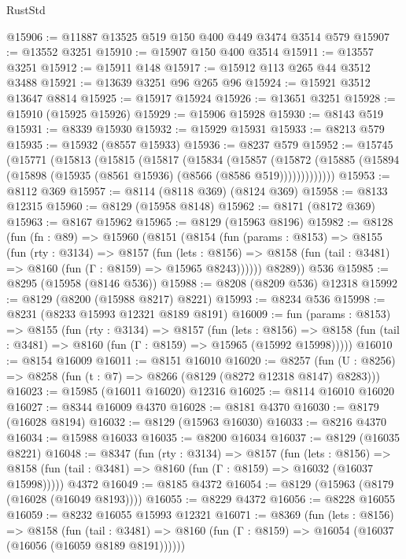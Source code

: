 \begin{lexlean}{RustStd}
\begin{coremodule}
@15906 := @11887 @13525 @519 @150 @400 @449 @3474 @3514 @579
@15907 := @13552 @3251
@15910 := @15907 @150 @400 @3514
@15911 := @13557 @3251
@15912 := @15911 @148
@15917 := @15912 @113 @265 @44 @3512 @3488
@15921 := @13639 @3251 @96 @265 @96
@15924 := @15921 @3512 @13647 @8814
@15925 := @15917 @15924
@15926 := @13651 @3251
@15928 := @15910 (@15925 @15926)
@15929 := @15906 @15928
@15930 := @8143 @519
@15931 := @8339 @15930
@15932 := @15929 @15931
@15933 := @8213 @579
@15935 := @15932 (@8557 @15933)
@15936 := @8237 @579
@15952 := @15745
    (@15771
      (@15813
        (@15815
          (@15817
            (@15834
              (@15857
                (@15872
                  (@15885 (@15894 (@15898 (@15935 (@8561 @15936) (@8566 (@8586 @519)))))))))))))
@15953 := @8112 @369
@15957 := @8114 (@8118 @369) (@8124 @369)
@15958 := @8133 @12315
@15960 := @8129 (@15958 @8148)
@15962 := @8171 (@8172 @369)
@15963 := @8167 @15962
@15965 := @8129 (@15963 @8196)
@15982 := @8128
    (fun (fn : @89) =>
    @15960
      (@8151
        (@8154
          (fun (params : @8153) =>
          @8155
            (fun (rty : @3134) =>
            @8157
              (fun (lets : @8156) =>
              @8158 (fun (tail : @3481) => @8160 (fun (Γ : @8159) => @15965 @8243))))))
        @8289))
    @536
@15985 := @8295 (@15958 (@8146 @536))
@15988 := @8208 (@8209 @536) @12318
@15992 := @8129 (@8200 (@15988 @8217) @8221)
@15993 := @8234 @536
@15998 := @8231 (@8233 @15993 @12321 @8189 @8191)
@16009 := fun (params : @8153) =>
  @8155
    (fun (rty : @3134) =>
    @8157
      (fun (lets : @8156) =>
      @8158 (fun (tail : @3481) => @8160 (fun (Γ : @8159) => @15965 (@15992 @15998)))))
@16010 := @8154 @16009
@16011 := @8151 @16010
@16020 := @8257
    (fun (U : @8256) => @8258 (fun (t : @7) => @8266 (@8129 (@8272 @12318 @8147) @8283)))
@16023 := @15985 (@16011 @16020) @12316
@16025 := @8114 @16010 @16020
@16027 := @8344 @16009 @4370
@16028 := @8181 @4370
@16030 := @8179 (@16028 @8194)
@16032 := @8129 (@15963 @16030)
@16033 := @8216 @4370
@16034 := @15988 @16033
@16035 := @8200 @16034
@16037 := @8129 (@16035 @8221)
@16048 := @8347
    (fun (rty : @3134) =>
    @8157
      (fun (lets : @8156) =>
      @8158 (fun (tail : @3481) => @8160 (fun (Γ : @8159) => @16032 (@16037 @15998)))))
    @4372
@16049 := @8185 @4372
@16054 := @8129 (@15963 (@8179 (@16028 (@16049 @8193))))
@16055 := @8229 @4372
@16056 := @8228 @16055
@16059 := @8232 @16055 @15993 @12321
@16071 := @8369
    (fun (lets : @8156) =>
    @8158
      (fun (tail : @3481) =>
      @8160 (fun (Γ : @8159) => @16054 (@16037 (@16056 (@16059 @8189 @8191))))))

\end{coremodule}
\end{lexlean}
